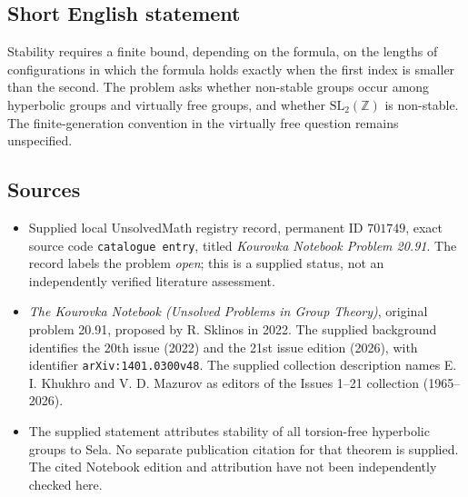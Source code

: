 \documentclass[11pt]{article}
\newcommand{\Z}{\mathbb{Z}}
\begin{document}
\subsection{Short English statement}
Stability requires a finite bound, depending on the formula, on the lengths of configurations in which the formula holds exactly when the first index is smaller than the second. The problem asks whether non-stable groups occur among hyperbolic groups and virtually free groups, and whether \(\mathrm{SL}_2(\Z)\) is non-stable. The finite-generation convention in the virtually free question remains unspecified.
\subsection{Sources}
\begin{itemize}
\item Supplied local UnsolvedMath registry record, permanent ID \(701749\), exact source code \texttt{catalogue entry}, titled \emph{Kourovka Notebook Problem 20.91}. The record labels the problem \emph{open}; this is a supplied status, not an independently verified literature assessment.
\item \emph{The Kourovka Notebook (Unsolved Problems in Group Theory)}, original problem 20.91, proposed by R. Sklinos in 2022. The supplied background identifies the 20th issue (2022) and the 21st issue edition (2026), with identifier \texttt{arXiv:1401.0300v48}. The supplied collection description names E. I. Khukhro and V. D. Mazurov as editors of the Issues 1--21 collection (1965--2026).
\item The supplied statement attributes stability of all torsion-free hyperbolic groups to Sela. No separate publication citation for that theorem is supplied. The cited Notebook edition and attribution have not been independently checked here.
\end{itemize}
\end{document}
